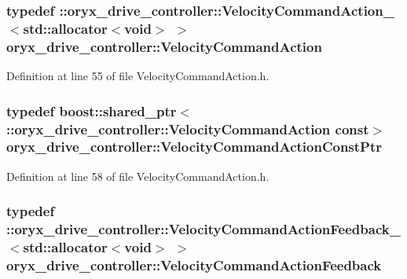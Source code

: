 \subsubsection[{\-Velocity\-Command\-Action}]{\setlength{\rightskip}{0pt plus 5cm}typedef \-::{\bf oryx\-\_\-drive\-\_\-controller\-::\-Velocity\-Command\-Action\-\_\-}$<$std\-::allocator$<$void$>$ $>$ {\bf oryx\-\_\-drive\-\_\-controller\-::\-Velocity\-Command\-Action}}\label{namespaceoryx__drive__controller_acbd4e57904a01690621e65a03e0a9a46}


\-Definition at line 55 of file \-Velocity\-Command\-Action.\-h.

\subsubsection[{\-Velocity\-Command\-Action\-Const\-Ptr}]{\setlength{\rightskip}{0pt plus 5cm}typedef boost\-::shared\-\_\-ptr$<$ \-::{\bf oryx\-\_\-drive\-\_\-controller\-::\-Velocity\-Command\-Action} const$>$ {\bf oryx\-\_\-drive\-\_\-controller\-::\-Velocity\-Command\-Action\-Const\-Ptr}}\label{namespaceoryx__drive__controller_a636974a6beceae5963faec8abc44b3a1}


\-Definition at line 58 of file \-Velocity\-Command\-Action.\-h.

\subsubsection[{\-Velocity\-Command\-Action\-Feedback}]{\setlength{\rightskip}{0pt plus 5cm}typedef \-::{\bf oryx\-\_\-drive\-\_\-controller\-::\-Velocity\-Command\-Action\-Feedback\-\_\-}$<$std\-::allocator$<$void$>$ $>$ {\bf oryx\-\_\-drive\-\_\-controller\-::\-Velocity\-Command\-Action\-Feedback}}\label{namespaceoryx__drive__controller_a87c18971fa23f9e1c0532d8303e9e6e0}


